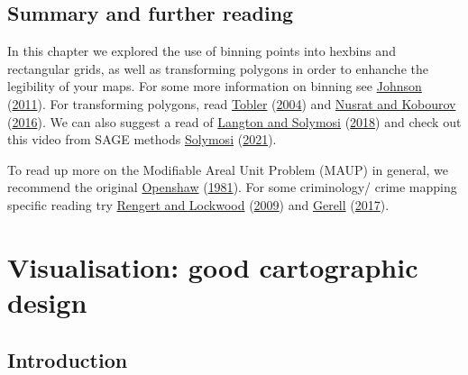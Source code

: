 \documentclass[
]{book}
\begin{document}
\hypertarget{summary-and-further-reading-3}{%
\section{Summary and further reading}\label{summary-and-further-reading-3}}

In this chapter we explored the use of binning points into hexbins and rectangular grids, as well as transforming polygons in order to enhanche the legibility of your maps. For some more information on binning see \protect\hyperlink{ref-Johnson_2011}{Johnson} (\protect\hyperlink{ref-Johnson_2011}{2011}). For transforming polygons, read \protect\hyperlink{ref-Tobler_2004}{Tobler} (\protect\hyperlink{ref-Tobler_2004}{2004}) and \protect\hyperlink{ref-Nusrat_2016}{Nusrat and Kobourov} (\protect\hyperlink{ref-Nusrat_2016}{2016}). We can also suggest a read of \protect\hyperlink{ref-Langton_2018}{Langton and Solymosi} (\protect\hyperlink{ref-Langton_2018}{2018}) and check out this video from SAGE methods \protect\hyperlink{ref-Solymosi_2021}{Solymosi} (\protect\hyperlink{ref-Solymosi_2021}{2021}).

To read up more on the Modifiable Areal Unit Problem (MAUP) in general, we recommend the original \protect\hyperlink{ref-Openshaw_1981}{Openshaw} (\protect\hyperlink{ref-Openshaw_1981}{1981}). For some criminology/ crime mapping specific reading try \protect\hyperlink{ref-Rengert_2009}{Rengert and Lockwood} (\protect\hyperlink{ref-Rengert_2009}{2009}) and \protect\hyperlink{ref-Gerell_2017}{Gerell} (\protect\hyperlink{ref-Gerell_2017}{2017}).

\hypertarget{visualisation-good-cartographic-design}{%
\chapter{Visualisation: good cartographic design}\label{visualisation-good-cartographic-design}}

\hypertarget{introduction-4}{%
\section{Introduction}\label{introduction-4}}
\end{document}
